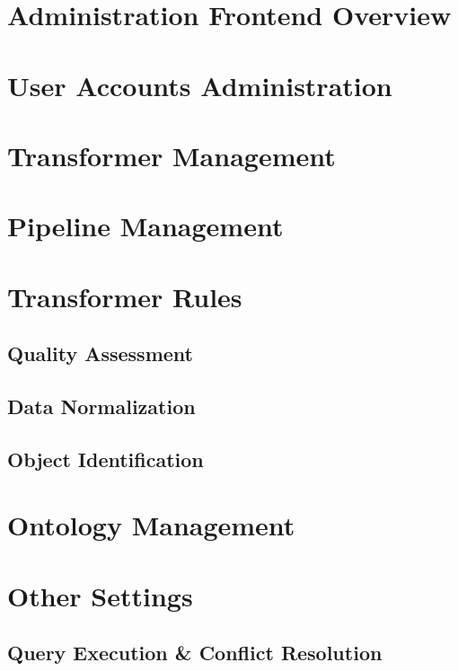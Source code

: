 \section{Administration Frontend Overview}

\section{User Accounts Administration}

\section{Transformer Management}
\label{sec:transformerManagement}

\section{Pipeline Management}
\label{sec:pipelineManagement}

\section{Transformer Rules}
\label{sec:transformerRules}

\subsection*{Quality Assessment}

\subsection*{Data Normalization}

\subsection*{Object Identification}

\section{Ontology Management}
\label{sec:ontologyManagement}

\section{Other Settings}

\subsection{Query Execution \& Conflict Resolution}
\label{sec:QEnCR}

